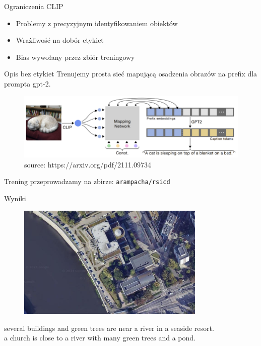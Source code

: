 \documentclass{beamer}
\begin{document}
\begin{frame}{Ograniczenia CLIP}
  \begin{itemize}
    \item Problemy z precyzyjnym identyfikowaniem obiektów
    \item Wrażliwość na dobór etykiet
    \item Bias wywołany przez zbiór treningowy
  \end{itemize}
\end{frame}

\begin{frame}{Opis bez etykiet}
  Trenujemy prosta sieć mapującą osadzenia obrazów na prefix dla prompta gpt-2.
  \begin{figure}
    \centering
    \includegraphics[width=1.0\textwidth]{../img/clipcap-overview.png}
    \caption*{\tiny source: https://arxiv.org/pdf/2111.09734}
  \end{figure}
  Trening przeprowadzamy na zbirze: \texttt{arampacha/rsicd}
\end{frame}

\begin{frame}{Wyniki}
  \begin{figure}
    \centering
    \includegraphics[width=0.8\textwidth]{../img/satellite.png}
  \end{figure}
  several buildings and green trees are near a river in a seaside resort. \\[1em]
  a church is close to a river with many green trees and a pond.
\end{frame}
\end{document}
